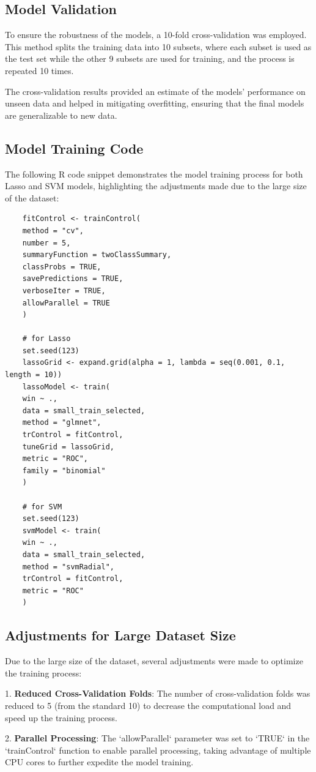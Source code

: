 \documentclass[12pt]{article}
\begin{document}
\subsection{Model Validation}
To ensure the robustness of the models, a 10-fold cross-validation was employed. This method splits the training data into 10 subsets, where each subset is used as the test set while the other 9 subsets are used for training, and the process is repeated 10 times.

The cross-validation results provided an estimate of the models' performance on unseen data and helped in mitigating overfitting, ensuring that the final models are generalizable to new data.


\subsection{Model Training Code}
The following R code snippet demonstrates the model training process for both Lasso and SVM models, highlighting the adjustments made due to the large size of the dataset:

\begin{verbatim}
	fitControl <- trainControl(
	method = "cv",  
	number = 5,    
	summaryFunction = twoClassSummary,  
	classProbs = TRUE,  
	savePredictions = TRUE,  
	verboseIter = TRUE,  
	allowParallel = TRUE  
	)
	
	# for Lasso 
	set.seed(123)
	lassoGrid <- expand.grid(alpha = 1, lambda = seq(0.001, 0.1, length = 10))  
	lassoModel <- train(
	win ~ .,  
	data = small_train_selected,
	method = "glmnet",
	trControl = fitControl,
	tuneGrid = lassoGrid,
	metric = "ROC",
	family = "binomial"
	)
	
	# for SVM
	set.seed(123)
	svmModel <- train(
	win ~ .,
	data = small_train_selected,
	method = "svmRadial",
	trControl = fitControl,
	metric = "ROC"
	)
\end{verbatim}


\subsection{Adjustments for Large Dataset Size}
Due to the large size of the dataset, several adjustments were made to optimize the training process:

1. \textbf{Reduced Cross-Validation Folds}: The number of cross-validation folds was reduced to 5 (from the standard 10) to decrease the computational load and speed up the training process.

2. \textbf{Parallel Processing}: The `allowParallel` parameter was set to `TRUE` in the `trainControl` function to enable parallel processing, taking advantage of multiple CPU cores to further expedite the model training.
\end{document}
